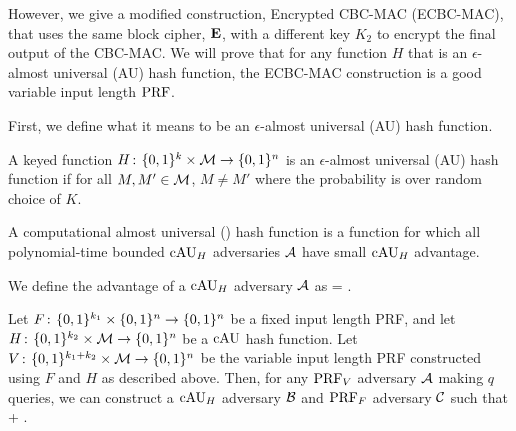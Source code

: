 However, we give a modified construction, Encrypted CBC-MAC (ECBC-MAC), that uses the same block cipher, ${\mbox{\bf E}}$, with a different key $K_2$ to encrypt the final output of the CBC-MAC.  We will prove that for any function $H$ that is an  $\epsilon$-almost universal (AU) hash function, the ECBC-MAC construction is a good variable input length $\textnormal{PRF}$. 

First, we define what it means to be an $\epsilon$-almost universal (AU) hash function.

A keyed function $H{{\kern .05em}\colon{\kern .05em}}\{0,1\}^k\times{\cal M}\rightarrow\{0,1\}^n$ is
an $\epsilon$-almost universal (AU) hash function  if for all $M,M'\in{\cal M}$, $M \ne M'$
\bnm
   \le \epsilon
\enm
where the probability is over random choice of $K$.

A computational almost universal (\cAU) hash function is a function for which all polynomial-time bounded $\textnormal{cAU}_H$ adversaries ${\mathcal A}$ have small $\textnormal{cAU}_H$ advantage.
\begin{figure}[h]
\centering
{}
\end{figure}

We define the advantage of a $\textnormal{cAU}_H$ adversary ${\mathcal A}$ as
\bnm
   = \;.
\enm

\begin{figure}[h]
	\centering
\end{figure}
\begin{theorem} \label{thm:cau-vil-prf}
Let $F{{\kern .05em}\colon{\kern .05em}}\{0,1\}^{k_1}\times \{0,1\}^n\rightarrow \{0,1\}^n$ be a fixed input length PRF, and let $H{{\kern .05em}\colon{\kern .05em}} \{0,1\}^{k_2}\times {\cal M}\rightarrow \{0,1\}^n$ be a $\textnormal{cAU}$ hash function. Let $V{{\kern .05em}\colon{\kern .05em}} \{0,1\}^{k_1+k_2}\times {\cal M} \rightarrow \{0,1\}^n$ be the variable input length PRF constructed using $F$ and $H$ as described above. Then, for any $\textnormal{PRF}_V$ adversary ${\mathcal A}$ making $q$ queries, we can construct a $\textnormal{cAU}_H$ adversary ${\mathcal B}$ and $\textnormal{PRF}_F$ adversary ${\mathcal C}$ such that 
\bnm
	 \le {} + \;.
\enm
{}
\end{theorem}


